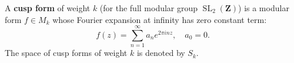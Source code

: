 A \textbf{cusp form} of weight $k$ (for the full modular group $\operatorname{SL}_2(\mathbf{Z})$) is a modular form $f \in M_k$ whose Fourier expansion at infinity has zero constant term:
$$
f(z) = \sum_{n=1}^\infty a_n e^{2\pi i n z}, \quad a_0 = 0.
$$
The space of cusp forms of weight $k$ is denoted by $S_k$.
